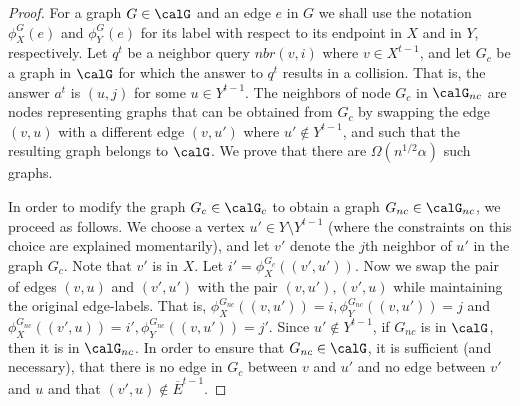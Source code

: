 \begin{proof}

For a graph $G\in \calG$ and an edge $e$ in $G$ we shall use the notation $\phi^{G}_X(e)$
and $\phi^G_Y(e)$ for its label with respect to its endpoint in $X$ and in $Y$, respectively.
Let $q^t$ be a neighbor query $nbr(v,i)$ where %
$v\in X^{t-1}$, 
and let $G_{c}$ be a graph in $\calG$ for which the answer to $q^t$ results in a collision. That is,  the answer $a^t$ is $(u,j)$ for some $u\in Y^{t-1}$. 
The neighbors of node $G_{c}$ in $\calG_{nc}$ are nodes representing graphs that can be obtained from $G_{c}$ by swapping the edge $(v,u)$ with a different edge $(v, u')$ where $u'\notin Y^{t-1}$, and  %
such that the resulting graph belongs to $\calG$.
We prove that there are $\Omega(n^{1/2}\alpha)$ such graphs. 
    
In order to modify the graph $G_c \in \calG_c$ to obtain a graph $G_{nc} \in \calG_{nc}$, we proceed as follows.
    We choose a vertex   $u'\in Y\setminus Y^{t-1}$ (where the constraints on this choice are explained momentarily), and let $v'$ denote the $j$th neighbor of $u'$ in the graph $G_{c}$. Note that $v'$ is in $X$. Let $i'=\phi^{G_c}_X((v',u'))$. Now we swap the pair of  edges $(v,u)$ 
    and $(v',u')$   with the pair  $(v,u'), (v',u)$  while maintaining the original edge-labels. That is, $\phi^{G_{nc}}_X((v,u'))=i, \phi^{G_{nc}}_Y((v,u'))=j$ and $\phi^{G_{nc}}_X((v',u))=i', \phi^{G_{nc}}_Y((v,u'))=j'$. 
    Since $u' \notin Y^{t-1}$, if $G_{nc}$ is in $\calG$, then it is in $\calG_{nc}$. In order to ensure that $G_{nc}\in\calG$, it is sufficient (and necessary), that there is no edge in $G_c$ between $v$ and $u'$ and no edge between $v'$ and $u$ and that
    $(v',u)\notin \overline{E}^{t-1}$.

    

\end{proof}
